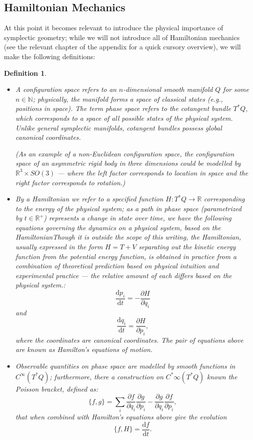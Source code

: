 \documentclass{tufte-handout}
\newtheorem{defn}{Definition}
\def\d{\mathrm{d}}
\begin{document}
\subsection{Hamiltonian Mechanics}
At this point it becomes relevant to introduce the physical importance of symplectic geometry; while we will not introduce all of Hamiltonian mechanics (see the relevant chapter of the appendix for a quick cursory overview), we will make the following definitions:
\begin{defn}
\begin{itemize}
\item A \emph{configuration space} refers to an $n$-dimensional smooth manifold $Q$ for some $n \in \mathbb{N}$; physically, the manifold forms a space of classical states (e.g., positions in space). The term \emph{phase space} refers to the cotangent bundle $T^*Q$, which corresponds to a space of all possible states of the physical system. Unlike general symplectic manifolds, cotangent bundles possess global \emph{canonical coordinates}.

(As an example of a non-Euclidean configuration space, the configuration space of an asymmetric rigid body in three dimensions could be modelled by $\mathbb{R}^3 \times SO(3)$ --- where the left factor corresponds to location in space and the right factor corresponds to rotation.)

\item By a \emph{Hamiltonian} we refer to a specified function $H: T^*Q \to \mathbb{R}$ corresponding to the energy of the physical system; as a path in phase space (parametrized by $t \in \mathbb{R}^+$) represents a change in state over time, we have the following equations governing the dynamics on a physical system, based on the Hamiltonian\emph{Though it is outside the scope of this writing, the Hamiltonian, usually expressed in the form $H = T + V$ separating out the kinetic energy function from the potential energy function, is obtained in practice from a combination of theoretical prediction based on physical intuition and experimental practice --- the relative amount of each differs based on the physical system.}:
$$
\frac{\d p_i}{\d t} = -\frac{\partial H}{\partial q_i}
$$
and
$$
\frac{\d q_i}{\d t} = \frac{\partial H}{\partial p_i},
$$
where the coordinates are canonical coordinates. The pair of equations above are known as \emph{Hamilton's equations} of motion.

\item \emph{Observable} quantities on phase space are modelled by smooth functions in $C^\infty(T^*Q)$; furthermore, there a construction on $C^*\infty(T^*Q)$ known the \emph{Poisson bracket}, defined as:
$$
\{f,g\} = \sum_i \frac{\partial f}{\partial q_i}\frac{\partial g}{\partial p_i} - \frac{\partial g}{\partial q_i}\frac{\partial f}{\partial p_i},
$$
that when combined with Hamilton's equations above give the evolution
$$
\{f,H\} = \frac{\d f}{\d t}.
$$

\end{itemize}
\end{defn}
\end{document}
